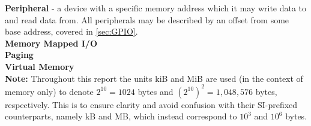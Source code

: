     \noindent \textbf{Peripheral} - a device with a specific memory address
    which it may write data to and read data from. All peripherals may be
    described by an offset from some base address, covered in \ref{sec:GPIO}. \\

    \noindent \textbf{Memory Mapped I/O} \\
    \noindent \textbf{Paging} \\
    \noindent \textbf{Virtual Memory} \\

    \noindent\textbf{Note:} Throughout this report the units kiB and MiB are used (in the
    context of memory only) to denote $2^{10} = 1024$ bytes and
    $(2^{10})^2=1,048,576$ bytes, respectively.  This is to ensure clarity and
    avoid confusion with their SI-prefixed counterparts, namely kB and MB, which
    instead correspond to $10^3$ and $10^6$ bytes.

